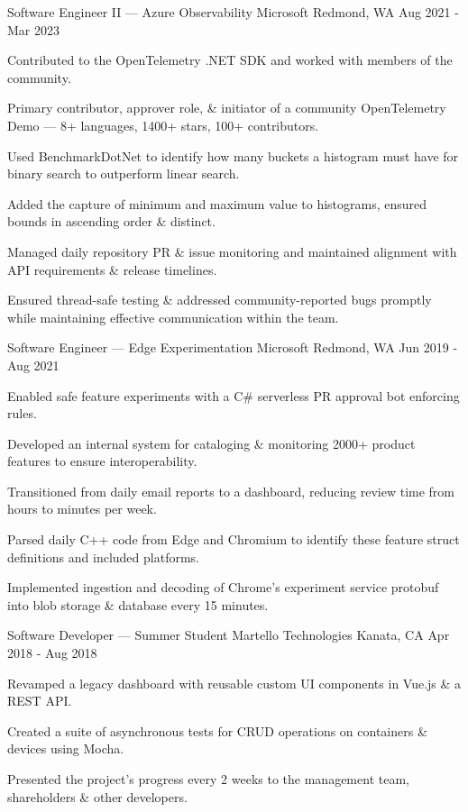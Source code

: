
\begin{cventries}
	\cventry
		{Software Engineer II --- Azure Observability}
		{Microsoft}
		{Redmond, WA}
		{Aug 2021 - Mar 2023}
		{\begin{cvitems}
			\item Contributed to the OpenTelemetry .NET SDK and worked with members of the community.
			\item Primary contributor, approver role, \& initiator of a community OpenTelemetry Demo --- 8+ languages, 1400+ stars, 100+ contributors.
			\item Used BenchmarkDotNet to identify how many buckets a histogram must have for binary search to outperform linear search.
			\item Added the capture of minimum and maximum value to histograms, ensured bounds in ascending order \& distinct.
			\item Managed daily repository PR \& issue monitoring and maintained alignment with API requirements \& release timelines.
			\item Ensured thread-safe testing \& addressed community-reported bugs promptly while maintaining effective communication within the team.
		\end{cvitems}}
		
	\cventry
		{Software Engineer --- Edge Experimentation}
		{Microsoft}
		{Redmond, WA}
		{Jun 2019 - Aug 2021}
		{\begin{cvitems}
			\item Enabled safe feature experiments with a C\# serverless PR approval bot enforcing rules.
			\item Developed an internal system for cataloging \& monitoring 2000+ product features to ensure interoperability.
			\item Transitioned from daily email reports to a dashboard, reducing review time from hours to minutes per week.
			\item Parsed daily C++ code from Edge and Chromium to identify these feature struct definitions and included platforms.
			\item Implemented ingestion and decoding of Chrome's experiment service protobuf into blob storage \& database every 15 minutes.
		\end{cvitems}}

	\cventry
		{Software Developer --- Summer Student}
		{Martello Technologies}
		{Kanata, CA}
		{Apr 2018 - Aug 2018}
		{\begin{cvitems}
			\item Revamped a legacy dashboard with reusable custom UI components in Vue.js \& a REST API.
			\item Created a suite of asynchronous tests for CRUD operations on containers \& devices using Mocha.
			\item Presented the project's progress every 2 weeks to the management team, shareholders \& other developers.
		\end{cvitems}}


\end{cventries}
